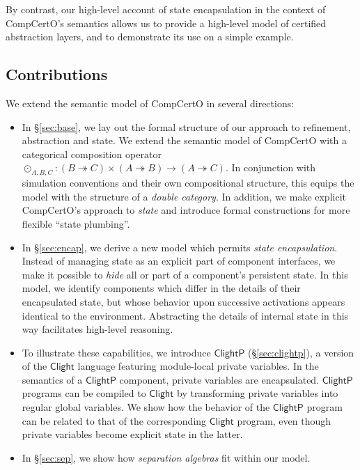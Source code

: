 \documentclass[acmsmall,screen,review,anonymous]{acmart}
\newcommand{\kw}[1]{\ensuremath{ \mathsf{#1} }}
\newcommand{\ClightP}{\ensuremath{\mathsf{ClightP}}}
\begin{document}
By contrast,
our high-level account of state encapsulation
in the context of CompCertO's semantics
allows us to provide a high-level model
of certified abstraction layers,
and to demonstrate its use on a simple example.

\subsection{Contributions} %

We extend the semantic model of CompCertO in several directions:
\begin{itemize}
\item
  In \S\ref{sec:base},
  we lay out the formal structure of
  our approach to refinement, abstraction and state.
  We extend the semantic model of CompCertO
  with a categorical composition operator
  ${\odot}_{A,B,C} : (B \twoheadrightarrow C) \times (A \twoheadrightarrow B)
    \rightarrow (A \twoheadrightarrow C)$.
  In conjunction with simulation conventions and their own compositional structure,
  this equips the model with the structure of a \emph{double category}.
  In addition,
  we make explicit CompCertO's approach to \emph{state}
  and introduce formal constructions
  for more flexible ``state plumbing''.
\item 
  In \S\ref{sec:encap},
  we derive a new model
  which permits \emph{state encapsulation}.
  Instead of managing state as an explicit part of component interfaces,
  we make it possible to \emph{hide}
  all or part of a component's persistent state.
  In this model,
  we identify components which differ in
  the details of their encapsulated state,
  but whose behavior upon successive activations
  appears identical to the environment.
  Abstracting the details of internal state in this way
  facilitates high-level reasoning.
\item
  To illustrate these capabilities,
  we introduce $\ClightP$ (\S\ref{sec:clightp}),
  a version of the $\kw{Clight}$ language
  featuring module-local private variables.
  In the semantics of a $\ClightP$ component,
  private variables are encapsulated.
  $\ClightP$ programs can be compiled to $\kw{Clight}$
  by transforming private variables into
  regular global variables.
  We show how the behavior of the $\ClightP$ program
  can be related to that of the corresponding $\kw{Clight}$ program,
  even though private variables become explicit state in the latter.
\item
  In \S\ref{sec:sep},
  we show how \emph{separation algebras} fit within our model.

\end{itemize}
\end{document}
